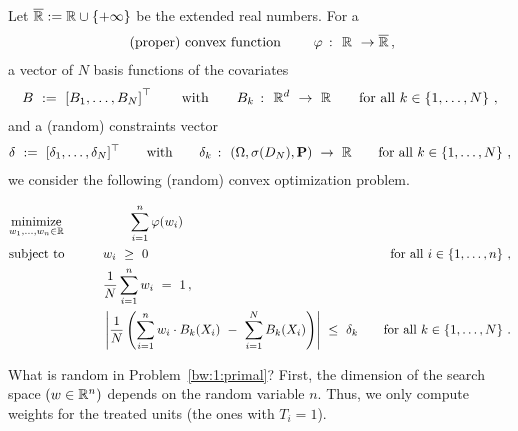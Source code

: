 Let 
$
\overline{\mathbb{R}}:=\mathbb{R}\cup \left\{ +\infty \right\}
$
be the extended real numbers.
For a 
\begin{align*}
  \text{
(proper) convex function
  }
  \qquad
  \varphi\ \colon\  \mathbb{R}\ \to\overline{\mathbb{R}} 
  \,,
\end{align*}
a vector of $N$ basis functions of the covariates 
\begin{gather*}
  B
  \ 
  :=
  \ 
  \left[ 
    B_1,\ldots,B_N
  \right]^\top
  \qquad
  \text{with}\qquad 
  B_k\ \colon\  \R^d\ \to\ \R
  \qquad
  \text{for all}\ k\in \left\{ 1,\ldots,N \right\}
  \,,
\end{gather*}
and a (random) constraints vector
\begin{align*}
\delta\ :=\ [\delta_1,\ldots,\delta_N]^\top
\qquad
  \text{with}\qquad 
  \delta_k\ \colon\  (\Omega,\sigma(D_N),\mathbf{P})\ \to\ \mathbb{R}
  \qquad
  \text{for all}\ k\in \left\{ 1,\ldots,N \right\}
  \,,
\end{align*}
we consider the following (random) convex optimization problem.
\begin{fproblem}
  \label{bw:1:primal}
\begin{align*}
    &\underset{w_1, \ldots, w_n \in \R}
    {\text{minimize}}
    &&\qquad\qquad
    \sum_{i = 1}^{n} 
    \varphi(w_i)
    &&&
    \\
    &\text{subject to}
    &&\qquad
    w_i 
    \ 
    \ge
    \ 
    0
    &&&
    \text{for all}\ 
    i \in \left\{ 1, \ldots, n \right\}
    \,,
    \\
    & 
    &&
    \qquad
    \frac{1}{N}
    \sum_{i=1}^{n} 
    w_i
    \ 
    =
    \ 
    1
    \,,
    \\
    & 
    &&\qquad
    \left| 
      \frac{1}{N} 
      \left( 
      \sum_{i = 1}^{n} 
      w_i
      \cdot
      B_k(X_i)
      \ 
      -
      \ 
      \sum_{i=1}^{N} 
      B_k(X_i)
      \right)
    \right|
    \ 
    \le 
    \ 
    \delta_k
    &&&
    \text{for all}\ 
    k \in \left\{ 1, \ldots, N \right\}
    \,.
\end{align*}
\end{fproblem}
What is random in Problem~\ref{bw:1:primal}?
First, the dimension of the search space $(w\in\mathbb{R}^n)$ depends on the random variable $n$. 
Thus, we only compute weights for the treated units (the ones with $T_i=1$).
